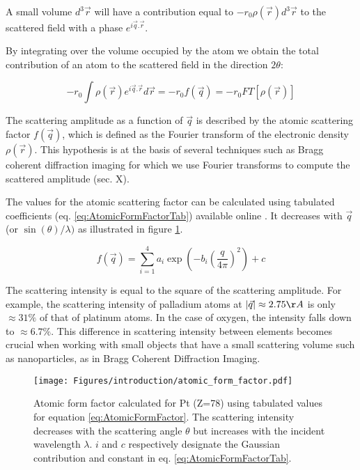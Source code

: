 A small volume $d^3\vec{r}$ will have a contribution equal to $-r_0 \rho(\vec{r})d^3\vec{r}$ to the scattered field with a phase $e^{i\vec{q}.\vec{r}}$.

By integrating over the volume occupied by the atom we obtain the total contribution of an atom to the scattered field in the direction $2\theta$:

\begin{equation}
    \label{eq:AtomicFormFactor}
    -r_0 \int \rho (\vec{r}) e^{i\vec{q}.\vec{r}} d\vec{r} = -r_0 f(\vec{q}) = -r_0 FT [\rho (\vec{r})]
\end{equation}

The scattering amplitude as a function of $\vec{q}$ is described by the atomic scattering factor $f(\vec{q})$, which is defined as the Fourier transform of the electronic density $\rho(\vec{r})$.
This hypothesis is at the basis of several techniques such as Bragg coherent diffraction imaging for which we use Fourier transforms to compute the scattered amplitude (sec. X).

The values for the atomic scattering factor can be calculated using tabulated coefficients (eq. \ref{eq:AtomicFormFactorTab}) available online \parencite{InterTablesOfCryst}.
It decreases with $\vec{q}$ (or $\sin(\theta) / \lambda)$ as illustrated in figure \ref{fig:atomic_form_factor}.

\begin{equation}
    \label{eq:AtomicFormFactorTab}
    f(\vec{q}) = \sum_{i=1}^4 a_i \exp (-b_i (\frac{q} {4\pi})^2) + c
\end{equation}

The scattering intensity is equal to the square of the scattering amplitude.
For example, the scattering intensity of palladium atoms at $|\vec{q}| \approx 2.75 \AA$ is only $\approx 31\%$ of that of platinum atoms. In the case of oxygen, the intensity falls down to $\approx 6.7\%$.
This difference in scattering intensity between elements becomes crucial when working with small objects that have a small scattering volume such as nanoparticles, as in Bragg Coherent Diffraction Imaging.

\begin{figure}[!htb]
    \centering
    \texttt{[image: Figures/introduction/atomic\_form\_factor.pdf]}
    \caption{
    Atomic form factor calculated for Pt (Z=78) using tabulated values \parencite{InterTablesOfCryst} for equation \ref{eq:AtomicFormFactor}. The scattering intensity decreases with the scattering angle $\theta$ but increases with the incident wavelength $\lambda$. $i$ and $c$ respectively designate the Gaussian contribution and constant in eq. \ref{eq:AtomicFormFactorTab}.
    }
    \label{fig:atomic_form_factor}
\end{figure}

